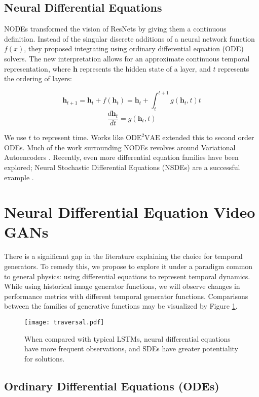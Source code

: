 \documentclass[tablecaption=bottom,pmlr]{jmlr}
\begin{document}
\subsection{Neural Differential Equations}

NODEs \citep{neuralode} transformed the vision of ResNets \citep{resnet} by giving them a continuous definition. Instead of the singular discrete additions of a neural network function $f(x)$, they proposed integrating using ordinary differential equation (ODE) solvers.  The new interpretation allows for an approximate continuous temporal representation, where $\mathbf{h}$ represents the hidden state of a layer, and $t$ represents the ordering of layers:

$$\mathbf{h}_{t+1} = \mathbf{h}_t + f(\mathbf{h}_t) = \mathbf{h}_t + \int_t^{t+1} g(\mathbf{h}_t,t)t$$
$$\frac{d\mathbf{h}_t}{dt}=g(\mathbf{h}_t,t)$$

We use $t$ to represent time.
Works like $\textrm{ODE}^2\textrm{VAE}$ \citep{ode2vae} extended this to second order ODEs. Much of the work surrounding NODEs revolves around Variational Autoencoders \citep{neuralode, ffjord, ode2vae}. Recently, even more differential equation families have been explored; Neural Stochastic Differential Equations (NSDEs) are a successful example \citep{sde, sde2}.

\section{Neural Differential Equation Video GANs}

There is a significant gap in the literature explaining the choice for temporal generators. To remedy this, we propose to explore it under a paradigm common to general physics: using differential equations to represent temporal dynamics. While using historical image generator functions, we will observe changes in performance metrics with different temporal generator functions. Comparisons between the families of generative functions may be visualized by Figure \ref{fig:latent_space}.

\begin{figure}
    \centering
    \texttt{[image: traversal.pdf]}
    \caption{When compared with typical LSTMs, neural differential equations have more frequent observations, and SDEs have greater potentiality for solutions.}
    \label{fig:latent_space}
\end{figure}

\subsection{Ordinary Differential Equations (ODEs)}
\end{document}
